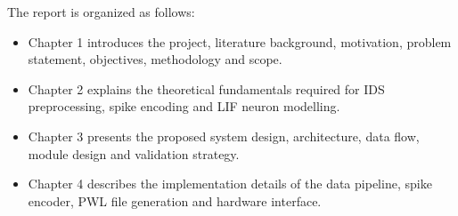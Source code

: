 The report is organized as follows:
\begin{itemize}
\item Chapter 1 introduces the project, literature background, motivation, problem statement, objectives, methodology and scope.
\item Chapter 2 explains the theoretical fundamentals required for IDS preprocessing, spike encoding and LIF neuron modelling.
\item Chapter 3 presents the proposed system design, architecture, data flow, module design and validation strategy.
\item Chapter 4 describes the implementation details of the data pipeline, spike encoder, PWL file generation and hardware interface.
\end{itemize}
